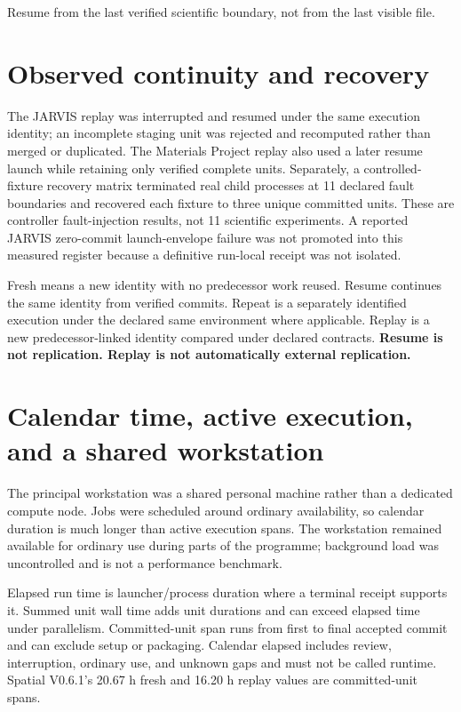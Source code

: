 \begin{governingrule}
Resume from the last verified scientific boundary, not from the last visible file.
\end{governingrule}

\section{Observed continuity and recovery}
The JARVIS replay was interrupted and resumed under the same execution identity; an incomplete staging unit was rejected and recomputed rather than merged or duplicated. The Materials Project replay also used a later resume launch while retaining only verified complete units. Separately, a controlled-fixture recovery matrix terminated real child processes at 11 declared fault boundaries and recovered each fixture to three unique committed units. These are controller fault-injection results, not 11 scientific experiments. A reported JARVIS zero-commit launch-envelope failure was not promoted into this measured register because a definitive run-local receipt was not isolated.

Fresh means a new identity with no predecessor work reused. Resume continues the same identity from verified commits. Repeat is a separately identified execution under the declared same environment where applicable. Replay is a new predecessor-linked identity compared under declared contracts. \textbf{Resume is not replication. Replay is not automatically external replication.}

\section{Calendar time, active execution, and a shared workstation}
The principal workstation was a shared personal machine rather than a dedicated compute node. Jobs were scheduled around ordinary availability, so calendar duration is much longer than active execution spans. The workstation remained available for ordinary use during parts of the programme; background load was uncontrolled and is not a performance benchmark.

Elapsed run time is launcher/process duration where a terminal receipt supports it. Summed unit wall time adds unit durations and can exceed elapsed time under parallelism. Committed-unit span runs from first to final accepted commit and can exclude setup or packaging. Calendar elapsed includes review, interruption, ordinary use, and unknown gaps and must not be called runtime. Spatial V0.6.1's 20.67 h fresh and 16.20 h replay values are committed-unit spans.

